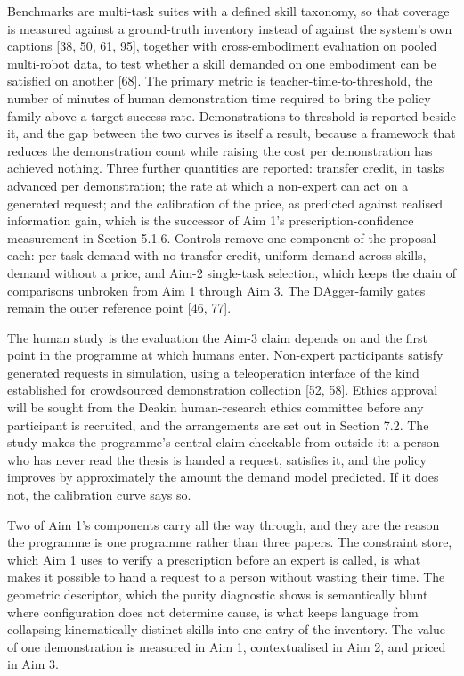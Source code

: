 \documentclass[
  11pt,
]{article}
\begin{document}
Benchmarks are multi-task suites with a defined skill taxonomy, so that
coverage is measured against a ground-truth inventory instead of against
the system's own captions {[}38, 50, 61, 95{]}, together with
cross-embodiment evaluation on pooled multi-robot data, to test whether
a skill demanded on one embodiment can be satisfied on another {[}68{]}.
The primary metric is teacher-time-to-threshold, the number of minutes
of human demonstration time required to bring the policy family above a
target success rate. Demonstrations-to-threshold is reported beside it,
and the gap between the two curves is itself a result, because a
framework that reduces the demonstration count while raising the cost
per demonstration has achieved nothing. Three further quantities are
reported: transfer credit, in tasks advanced per demonstration; the rate
at which a non-expert can act on a generated request; and the
calibration of the price, as predicted against realised information
gain, which is the successor of Aim 1's prescription-confidence
measurement in Section 5.1.6. Controls remove one component of the
proposal each: per-task demand with no transfer credit, uniform demand
across skills, demand without a price, and Aim-2 single-task selection,
which keeps the chain of comparisons unbroken from Aim 1 through Aim 3.
The DAgger-family gates remain the outer reference point {[}46, 77{]}.

The human study is the evaluation the Aim-3 claim depends on and the
first point in the programme at which humans enter. Non-expert
participants satisfy generated requests in simulation, using a
teleoperation interface of the kind established for crowdsourced
demonstration collection {[}52, 58{]}. Ethics approval will be sought
from the Deakin human-research ethics committee before any participant
is recruited, and the arrangements are set out in Section 7.2. The study
makes the programme's central claim checkable from outside it: a person
who has never read the thesis is handed a request, satisfies it, and the
policy improves by approximately the amount the demand model predicted.
If it does not, the calibration curve says so.

Two of Aim 1's components carry all the way through, and they are the
reason the programme is one programme rather than three papers. The
constraint store, which Aim 1 uses to verify a prescription before an
expert is called, is what makes it possible to hand a request to a
person without wasting their time. The geometric descriptor, which the
purity diagnostic shows is semantically blunt where configuration does
not determine cause, is what keeps language from collapsing
kinematically distinct skills into one entry of the inventory. The value
of one demonstration is measured in Aim 1, contextualised in Aim 2, and
priced in Aim 3.
\end{document}
